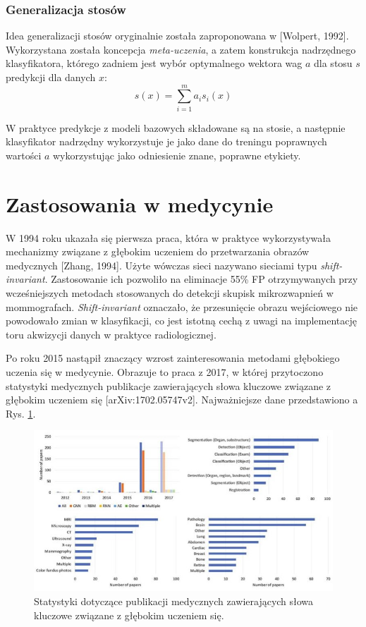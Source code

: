 \subsubsection{Generalizacja stosów}
Idea generalizacji stosów oryginalnie została zaproponowana w [Wolpert, 1992]. Wykorzystana została koncepcja \textit{meta-uczenia}, a zatem konstrukcja nadrzędnego klasyfikatora, którego zadniem jest wybór optymalnego wektora wag $a$ dla stosu $s$ predykcji dla danych $x$:
\begin{equation}
s(x) = \sum_{i=1}^{m}a_i s_i(x)
\end{equation}

W praktyce predykcje z modeli bazowych składowane są na stosie, a następnie klasyfikator nadrzędny wykorzystuje je jako dane do treningu poprawnych wartości $a$ wykorzystując jako odniesienie znane, poprawne etykiety.
 

\section{Zastosowania w medycynie}

W 1994 roku ukazała się pierwsza praca, która w praktyce wykorzystywała mechanizmy związane z głębokim uczeniem do przetwarzania obrazów medycznych [Zhang, 1994]. Użyte wówczas sieci nazywano sieciami typu \textit{shift-invariant}. Zastosowanie ich pozwoliło na eliminacje 55\% FP otrzymywanych przy wcześniejszych metodach stosowanych do detekcji skupisk mikrozwapnień w mommografach. \textit{Shift-invariant} oznaczało, że przesunięcie obrazu wejściowego nie powodowało zmian w klasyfikacji, co jest istotną cechą z uwagi na implementację toru akwizycji danych w praktyce radiologicznej.

Po roku 2015 nastąpił znaczący wzrost zainteresowania metodami głębokiego uczenia się w medycynie. Obrazuje to praca z 2017, w której przytoczono statystyki medycznych publikacje zawierających słowa kluczowe związane z głębokim uczeniem się [arXiv:1702.05747v2]. Najważniejsze dane przedstawiono a Rys. \ref{DL_CAD_stats}.
\begin{figure}[h!]
	\centering
	\includegraphics[width=1\textwidth]{figures/DL_CAD_statystyka.jpg}
	\caption{Statystyki dotyczące publikacji medycznych zawierających słowa kluczowe związane z głębokim uczeniem się.}
	\label{DL_CAD_stats}
\end{figure}

